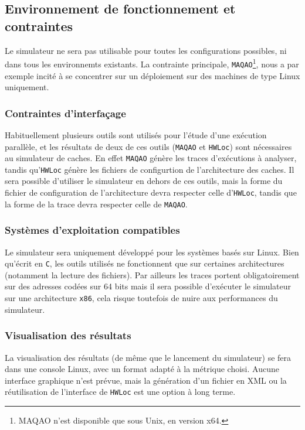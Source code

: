 \subsection{Environnement de fonctionnement et contraintes}

Le simulateur ne sera pas utilisable pour toutes les configurations possibles, ni dans tous les environnemts existants. La contrainte principale, \texttt{MAQAO}\footnote{MAQAO n'est disponible que sous Unix, en version x64.}, nous a par exemple incité à se concentrer sur un déploiement sur des machines de type Linux uniquement. 

\subsubsection{Contraintes d'interfaçage}

Habituellement plusieurs outils sont utilisés pour l'étude d'une exécution parallèle, et les résultats de deux de ces outils (\texttt{MAQAO} et \texttt{HWLoc}) sont nécessaires au simulateur de caches. En effet \texttt{MAQAO} génère les traces d'exécutions à analyser, tandis qu'\texttt{HWLoc}
génère les fichiers de configurtion de l'architecture des caches. Il sera possible d'utiliser le simulateur en dehors de ces outils, mais la forme du fichier de configuration de l'architecture devra respecter celle d'\texttt{HWLoc}, tandis que la forme de la trace devra respecter celle de \texttt{MAQAO}.

\subsubsection{Systèmes d'exploitation compatibles}

Le simulateur sera uniquement développé pour les systèmes basés sur Linux. Bien qu'écrit en \texttt{C}, les outils utilisés ne fonctionnent que sur certaines architectures (notamment la lecture des fichiers). Par ailleurs les traces portent obligatoirement sur des adresses codées sur 64 bits mais il sera possible d'exécuter le simulateur sur une architecture \verb!x86!, cela risque toutefois de nuire aux performances du simulateur.

\subsubsection{Visualisation des résultats}

La visualisation des résultats (de même que le lancement du simulateur) se fera dans une console Linux, avec un format adapté à la métrique choisi. Aucune interface graphique n'est prévue, mais la génération d'un fichier en XML ou la réutilisation de l'interface de \texttt{HWLoc} est une option à long terme.
